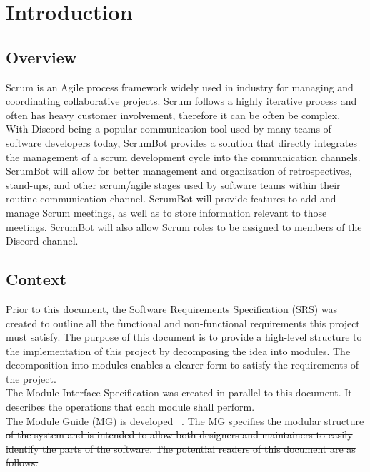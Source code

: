 \documentclass[12pt, titlepage]{article}
\begin{document}

\section{Introduction}
\subsection{Overview}
Scrum is an Agile process framework widely used in industry for managing and coordinating collaborative projects. Scrum follows a highly iterative process and often has heavy customer involvement, therefore it can be often be complex. With Discord being a popular communication tool used by many teams of software developers today, ScrumBot provides a solution that directly integrates the management of a scrum development cycle into the communication channels. ScrumBot will allow for better management and organization of retrospectives, stand-ups, and other scrum/agile stages used by software teams within their routine communication channel. ScrumBot will provide features to add and manage Scrum meetings, as well as to store information relevant to those meetings. ScrumBot will also allow Scrum roles to be assigned to members of the Discord channel.

\subsection{Context}
Prior to this document, the Software Requirements Specification (SRS) was created to outline all the functional and non-functional requirements this project must satisfy. The purpose of this document is to provide a high-level structure to the implementation of this project by decomposing the idea into modules. The decomposition into modules enables a clearer form to satisfy the requirements of the project.\\

\noindent The Module Interface Specification was created in parallel to this document. It describes the operations that each module shall perform.\\

\sout{\noindent The Module Guide (MG) is developed \mbox{~\citep{ParnasEtAl1984}}. The MG specifies the modular structure of the system and is intended to allow both designers and maintainers to easily identify the parts of the software. The potential readers of this document are as follows:}
\end{document}
